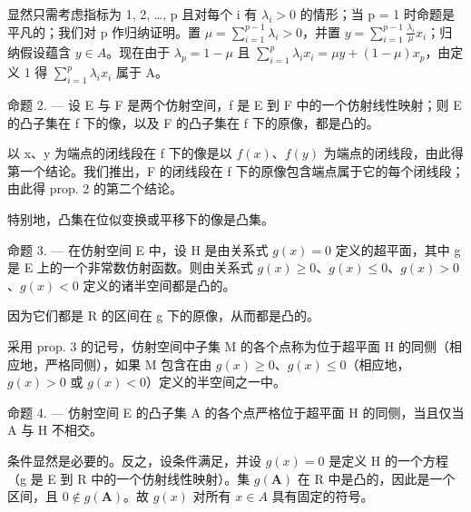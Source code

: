 显然只需考虑指标为 1, 2, \ldots, p 且对每个 i 有 \(\lambda_{i} > 0\) 的情形；当 p = 1 时命题是平凡的；我们对 p 作归纳证明。置 \(\mu = \sum_{i=1}^{p-1} \lambda_{i} > 0\)，并置 \(y = \sum_{i=1}^{p-1} \frac{\lambda_{i}}{\mu} x_{i}\)；归纳假设蕴含 \(y \in A\)。现在由于 \(\lambda_{p} = 1 - \mu\) 且 \(\sum_{i=1}^{p} \lambda_{i} x_{i} = \mu y + (1 - \mu) x_{p}\)，由定义 1 得 \(\sum_{i=1}^{p} \lambda_{i} x_{i}\) 属于 A。

命题 2. --- 设 E 与 F 是两个仿射空间，f 是 E 到 F 中的一个仿射线性映射；则 E 的凸子集在 f 下的像，以及 F 的凸子集在 f 下的原像，都是凸的。

以 x、y 为端点的闭线段在 f 下的像是以 \(f(x)\)、\(f(y)\) 为端点的闭线段，由此得第一个结论。我们推出，F 的闭线段在 f 下的原像包含端点属于它的每个闭线段；由此得 prop. 2 的第二个结论。

特别地，凸集在位似变换或平移下的像是凸集。

命题 3. --- 在仿射空间 E 中，设 H 是由关系式 \(g(x) = 0\) 定义的超平面，其中 g 是 E 上的一个非常数仿射函数。则由关系式 \(g(x) \geqslant 0\)、\(g(x) \leqslant 0\)、\(g(x) > 0\)、\(g(x) < 0\) 定义的诸半空间都是凸的。

因为它们都是 R 的区间在 g 下的原像，从而都是凸的。

采用 prop. 3 的记号，仿射空间中子集 M 的各个点称为位于超平面 H 的同侧（相应地，严格同侧），如果 M 包含在由 \(g(x) \geqslant 0\)、\(g(x) \leqslant 0\)（相应地，\(g(x) > 0\) 或 \(g(x) < 0\)）定义的半空间之一中。

命题 4. --- 仿射空间 E 的凸子集 A 的各个点严格位于超平面 H 的同侧，当且仅当 A 与 H 不相交。

条件显然是必要的。反之，设条件满足，并设 \(g(x) = 0\) 是定义 H 的一个方程（g 是 E 到 R 中的一个仿射线性映射）。集 \(g(\mathbf{A})\) 在 R 中是凸的，因此是一个区间，且 \(0 \notin g(\mathbf{A})\)。故 \(g(x)\) 对所有 \(x \in A\) 具有固定的符号。

